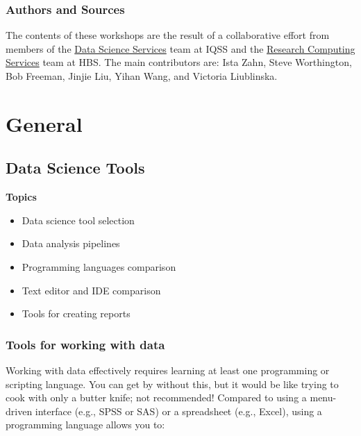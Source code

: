 \documentclass[]{book}
\providecommand{\tightlist}{%
  \setlength{\itemsep}{0pt}\setlength{\parskip}{0pt}}
\begin{document}
\hypertarget{authors-and-sources}{%
\section*{Authors and Sources}\label{authors-and-sources}}

The contents of these workshops are the result of a collaborative effort from members of the \href{http://dss.iq.harvard.edu}{Data Science Services} team at IQSS and the \href{https://training.rcs.hbs.org}{Research Computing Services} team at HBS. The main contributors are: Ista Zahn, Steve Worthington, Bob Freeman, Jinjie Liu, Yihan Wang, and Victoria Liublinska.

\hypertarget{part-general}{%
\part{General}\label{part-general}}

\hypertarget{data-science-tools}{%
\chapter{Data Science Tools}\label{data-science-tools}}

\textbf{Topics}

\begin{itemize}
\tightlist
\item
  Data science tool selection
\item
  Data analysis pipelines
\item
  Programming languages comparison
\item
  Text editor and IDE comparison
\item
  Tools for creating reports
\end{itemize}

\hypertarget{tools-for-working-with-data}{%
\section{Tools for working with data}\label{tools-for-working-with-data}}

Working with data effectively requires learning at least one programming or scripting language. You can get by without this, but it would be like trying to cook with only a butter knife; not recommended! Compared to using a menu-driven interface (e.g., SPSS or SAS) or a spreadsheet (e.g., Excel), using a programming language allows you to:
\end{document}
